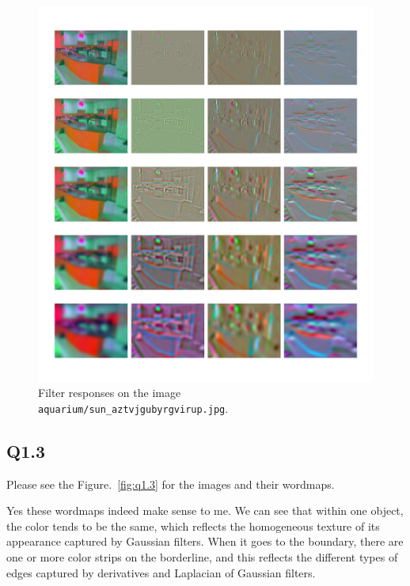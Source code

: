 \documentclass[11pt]{article}
\newcommand{\code}[1]{\texttt{#1}}
\begin{document}
\begin{figure}[h!]
    \centering
    \includegraphics[width=\linewidth]{../results/q1_1_2_responses.png}
    \caption{Filter responses on the image \code{aquarium/sun\_aztvjgubyrgvirup.jpg}.}
    \label{fig:q1.1.2}
\end{figure}

\newpage

\subsection*{Q1.3}

Please see the Figure.~\ref{fig:q1.3} for the images and their wordmaps.

Yes these wordmaps indeed make sense to me. We can see that within one object, the color tends to be the same, which reflects the homogeneous texture of its appearance captured by Gaussian filters. When it goes to the boundary, there are one or more color strips on the borderline, and this reflects the different types of edges captured by derivatives and Laplacian of Gaussian filters.
\end{document}
